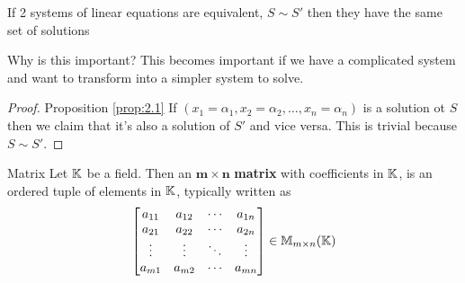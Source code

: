 
\begin{proposition} \label{prop:2.1}
    If 2 systems of linear equations are equivalent, \(S \sim S'\) then they have the same set of solutions
\end{proposition}
\begin{remark}
    Why is this important? This becomes important if we have a complicated system and want to transform into a simpler system to solve.
\end{remark}

\begin{proof} {Proposition \ref{prop:2.1}}
    If \((x_1 = \alpha_1, x_2 = \alpha_2, \dots, x_n = \alpha_n)\) is a solution ot \(S\) then we claim that it's also a solution of \(S'\) and vice versa. This is trivial because \(S \sim S'\).
\end{proof}

\begin{definition} {Matrix}
    Let \(\mathbb{K}\) be a field. Then an \(\mathbf{m \times n}\) \textbf{matrix} with coefficients in \(\mathbb{K}\), is an ordered tuple of elements in \(\mathbb{K}\), typically written as \[
        \begin{bmatrix}
            a_{11} & a_{12} & \cdots & a_{1n} \\
            a_{21} & a_{22} & \cdots & a_{2n} \\
            \vdots & \vdots & \ddots & \vdots \\
            a_{m1} & a_{m2} & \cdots & a_{mn} \\
        \end{bmatrix}
        \in \mathbb{M}_{m\times n}(\mathbb{K})
    \]
\end{definition}

